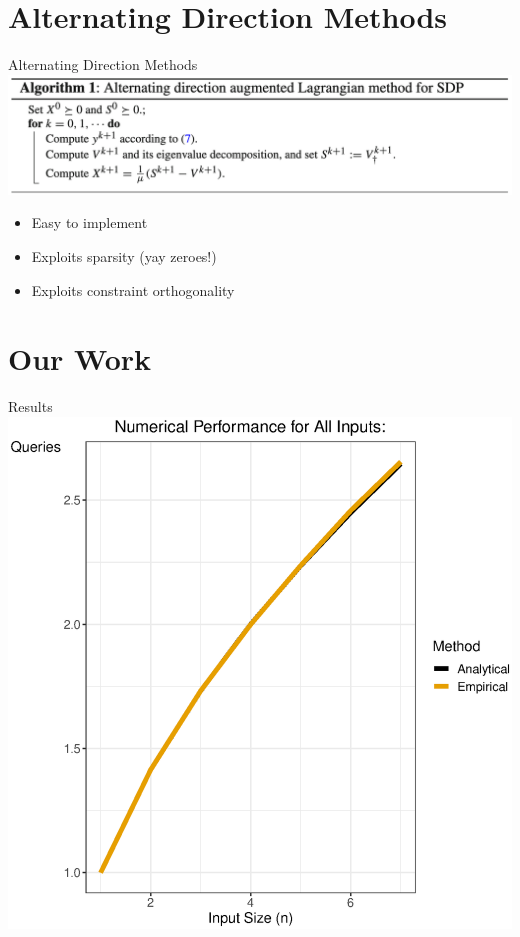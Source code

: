 \documentclass[12pt]{beamer}
\begin{document}
\section{Alternating Direction Methods}
\begin{frame}{Alternating Direction Methods \cite{adm}}
\centering
\includegraphics[scale=.15]{figures/adm_algorithm}
\bigskip
\begin{itemize}
    \item Easy to implement
    \item Exploits sparsity (yay zeroes!)
    \item Exploits constraint orthogonality
\end{itemize}
\end{frame}

\section{Our Work}
\begin{frame}{Results}
    \includegraphics[scale=.5]{figures/figure_all_or_complexity.eps}
\end{frame}
\end{document}

